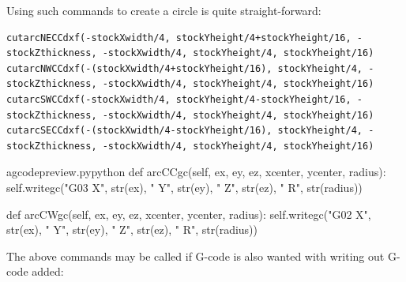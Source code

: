 \documentclass{ltxdoc}
\begin{document}
Using such commands to create a circle is quite straight-forward:

\begin{verbatim}
cutarcNECCdxf(-stockXwidth/4, stockYheight/4+stockYheight/16, -stockZthickness, -stockXwidth/4, stockYheight/4, stockYheight/16)
cutarcNWCCdxf(-(stockXwidth/4+stockYheight/16), stockYheight/4, -stockZthickness, -stockXwidth/4, stockYheight/4, stockYheight/16)
cutarcSWCCdxf(-stockXwidth/4, stockYheight/4-stockYheight/16, -stockZthickness, -stockXwidth/4, stockYheight/4, stockYheight/16)
cutarcSECCdxf(-(stockXwidth/4-stockYheight/16), stockYheight/4, -stockZthickness, -stockXwidth/4, stockYheight/4, stockYheight/16)
\end{verbatim}

\lstset{firstnumber=\thegcpy}
\begin{writecode}{a}{gcodepreview.py}{python}
    def arcCCgc(self, ex, ey, ez, xcenter, ycenter, radius):
        self.writegc("G03 X", str(ex), " Y", str(ey), " Z", str(ez), " R", str(radius))
           
    def arcCWgc(self, ex, ey, ez, xcenter, ycenter, radius):
        self.writegc("G02 X", str(ex), " Y", str(ey), " Z", str(ez), " R", str(radius))
           
\end{writecode}
\addtocounter{gcpy}{6}

The above commands may be called if G-code is also wanted with writing out G-code added:
\end{document}
